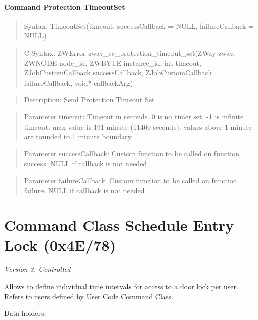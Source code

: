 \paragraph{Command Protection TimeoutSet}
\begin{quote}Syntax: TimeoutSet(timeout, successCallback = NULL, failureCallback = NULL)\end{quote}
\begin{quote}C Syntax: ZWError zway\_cc\_protection\_timeout\_set(ZWay zway, ZWNODE node\_id, ZWBYTE instance\_id, int timeout, ZJobCustomCallback successCallback, ZJobCustomCallback failureCallback, void* callbackArg)\end{quote}
\begin{quote}Description: Send Protection Timeout Set\end{quote}
\begin{quote}Parameter timeout: Timeout in seconds. 0 is no timer set. -1 is infinite timeout. max value is 191 minute (11460 seconds). values above 1 minute are rounded to 1 minute boundary\end{quote}
\begin{quote}Parameter successCallback: Custom function to be called on function success. NULL if callback is not needed\end{quote}
\begin{quote}Parameter failureCallback: Custom function to be called on function failure. NULL if callback is not needed\end{quote}



\section{Command Class Schedule Entry Lock (0x4E/78)}

\textit{Version 3, Controlled}
\newline

Allows to define individual time intervals for access to a door lock per user. Refers to users defined by User Code Command Class.
\newline

\noindent
Data holders:

